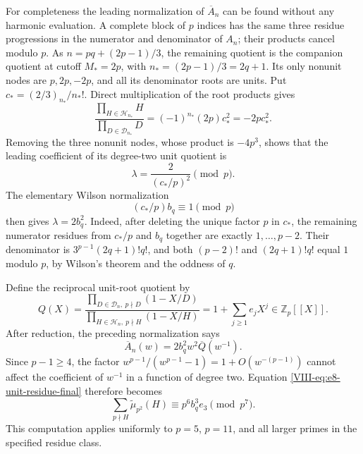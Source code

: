 \documentclass[11pt,letterpaper]{article}
\numberwithin{equation}{section}
\begin{document}
For completeness the leading normalization of \(\overline A_n\)
can be found without any harmonic evaluation.  A complete block of
\(p\) indices has the same three residue progressions in the numerator
and denominator of \(A_n\); their products cancel modulo \(p\).
As \(n=pq+(2p-1)/3\), the remaining quotient is the companion quotient
at cutoff \(M_*=2p\), with \(n_*=(2p-1)/3=2q+1\).
Its only nonunit nodes are \(p,2p,-2p\), and all its denominator
roots are units.  Put \(c_*=(2/3)_{n_*}/n_*!\).
Direct multiplication of the root products gives
\[
 \frac{\prod_{H\in\mathcal H_{n_*}}H}
      {\prod_{D\in\mathcal D_{n_*}}D}
       =(-1)^{n_*}(2p)c_*^2=-2pc_*^2.
\]
Removing the three nonunit nodes, whose product is \(-4p^3\), shows
that the leading coefficient of its degree-two unit quotient is
\[
 \lambda=\frac{2}{(c_*/p)^2}\pmod p.
\]
The elementary Wilson normalization
\[
 (c_*/p)b_q\equiv1\pmod p
\]
then gives \(\lambda=2b_q^2\).
Indeed, after deleting the unique factor \(p\) in \(c_*\), the remaining
numerator residues from \(c_*/p\) and \(b_q\) together are exactly
\(1,\ldots,p-2\).  Their denominator is
\(3^{p-1}(2q+1)!q!\), and both \((p-2)!\) and
\((2q+1)!q!\) equal \(1\) modulo \(p\), by Wilson's theorem and
the oddness of \(q\).

Define the reciprocal unit-root quotient by
\[
 Q(X)=
 \frac{\prod_{D\in\mathcal D_n,\ p\nmid D}(1-X/D)}
      {\prod_{H\in\mathcal H_n,\ p\nmid H}(1-X/H)}
       =1+\sum_{j\ge1}e_jX^j\in\mathbb Z_p[[X]].
\]
After reduction, the preceding normalization says
\[
 \overline A_n(w)=2b_q^2w^2\overline Q(w^{-1}).
\]
Since \(p-1\ge4\), the factor
\(w^{p-1}/(w^{p-1}-1)=1+O(w^{-(p-1)})\) cannot affect the coefficient
of \(w^{-1}\) in a function of degree two.  Equation
\eqref{VIII-eq:e8-unit-residue-final} therefore becomes
\begin{equation}\label{VIII-eq:e8-unit-mass-cubic}
 \boxed{\displaystyle
 \sum_{p\nmid H}\widetilde\mu_{p^2}(H)
       \equiv p^6 b_q^3e_3\pmod{p^7}.}
\end{equation}
This computation applies uniformly to \(p=5\), \(p=11\), and all
larger primes in the specified residue class.
\end{document}
